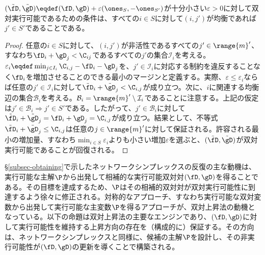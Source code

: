 \begin{prop}\label{prop-feasibility-dual-pair}
$(\tilde{\fD},\tilde{\gD})\eqdef(\fD,\gD)+\varepsilon(\ones_S,-\ones_{S'})$が十分小さい$\varepsilon>0$に対して双対実行可能であるための条件は、すべての$i\in S$に対して$(i,j')$が均衡であれば$j'\in S'$であることである。
\end{prop}
\begin{proof}
任意の$i\in S$に対して、$(i,j')$が非活性であるすべての$j'\in\range{m}'$、すなわち$\fD_i+\gD_j<\C_{ij}$であるすべての$j'$の集合$\mathcal{I}_{i}$を考える。$\varepsilon_i \eqdef \min_{j\in I_{i}} \C_{i,j}-\fD_i-\gD_j$を、$j'\in \mathcal{I}_i$に対応する制約を違反することなく$\fD_i$を増加させることのできる最小のマージンと定義する。実際、$\varepsilon\leq \varepsilon_i$ならば任意の$j'\in \mathcal{I}_i$に対して$\tilde{\fD}_i+\tilde{\gD}_j<\C_{i,j}$が成り立つ。次に、$i$に関連する均衡辺の集合$\mathcal{B}_i$を考える。$\mathcal{B}_i=\range{m}'\setminus \mathcal{I}_i$であることに注意する。上記の仮定は$j'\in\mathcal{B}_i\Rightarrow j'\in S'$である。したがって、$j'\in\mathcal{B}_i$に対して$\tilde{\fD}_i+\tilde{\gD}_j=\fD_i+\gD_j=\C_{i,j}$が成り立つ。結果として、不等式$\tilde{\fD}_i+\tilde{\gD}_j\leq \C_{i,j}$は任意の$j\in \range{m}'$に対して保証される。許容される最小の増加量、すなわち$\min_{i\in S} \varepsilon_i$よりも小さい増加$\varepsilon$を選ぶと、$(\tilde{\fD},\tilde{\gD})$が双対実行可能であることが回復される。
\end{proof}

\S\ref{subsec-obtaining}で示したネットワークシンプレックスの反復の主な動機は、実行可能な主解$\P$から出発して相補的な実行可能双対対$(\fD,\gD)$を得ることである。その目標を達成するため、$\P$はその相補的双対対が双対実行可能性に到達するよう徐々に修正される。対称的なアプローチ、すなわち実行可能な双対変数から出発して実行可能な主変数$\P$を得るアプローチが、双対上昇法の動機となっている。以下の命題は双対上昇法の主要なエンジンであり、$(\fD,\gD)$に対して実行可能性を維持する上昇方向の存在を（構成的に）保証する。その方向は、ネットワークシンプレックスと同様に、候補の主解$\P$を設計し、その非実行可能性が$(\fD,\gD)$の更新を導くことで構築される。

